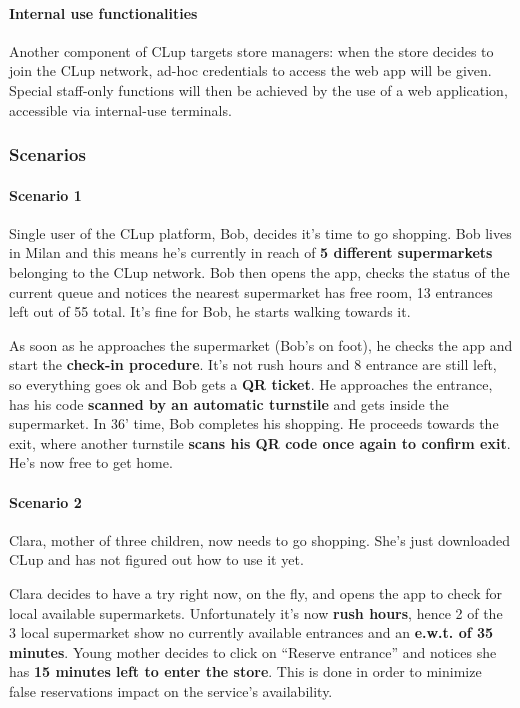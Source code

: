 \paragraph{Internal use functionalities}
Another component of CLup targets store managers: when the store decides to join the CLup network, ad-hoc credentials to access the web app will be given. Special staff-only functions will then be achieved by the use of a web application, accessible via internal-use terminals.

\subsubsection{Scenarios}
\paragraph{Scenario 1}

Single user of the CLup platform, Bob, decides it's time to go shopping.
Bob lives in Milan and this means he's currently in reach of \textbf{5 different supermarkets} belonging to the CLup network. \newline
Bob then opens the app, checks the status of the current queue and notices the nearest supermarket has free room, 13 entrances left out of 55 total. It's fine for Bob, he starts walking towards it.

As soon as he approaches the supermarket (Bob's on foot), he checks the app and start the \textbf{check-in procedure}. It's not rush hours and 8 entrance are still left, so everything goes ok and Bob gets a \textbf{QR ticket}. He approaches the entrance, has his code \textbf{scanned by an automatic turnstile} and gets inside the supermarket.\newline
In 36' time, Bob completes his shopping. He proceeds towards the exit, where another turnstile \textbf{scans his QR code once again to confirm exit}. He's now free to get home.

\paragraph{Scenario 2}

Clara, mother of three children, now needs to go shopping. She's just downloaded CLup and has not figured out how to use it yet.

Clara decides to have a try right now, on the fly, and opens the app to check for local available supermarkets. 
\newline Unfortunately it's now \textbf{rush hours}, hence 2 of the 3 local supermarket show no currently available entrances and an \textbf{e.w.t. of 35 minutes}. Young mother decides to click on ``Reserve entrance'' and notices she has \textbf{15 minutes left to enter the store}. This is done in order to minimize false reservations impact on the service's availability.

